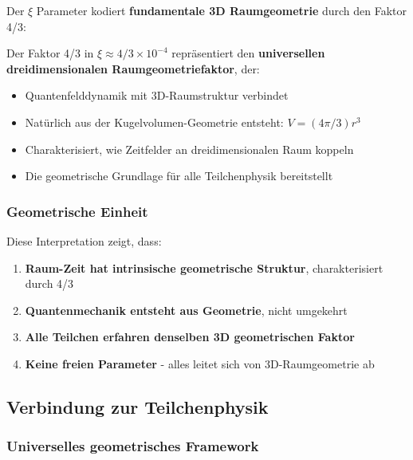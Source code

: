 	Der $\xi$ Parameter kodiert \textbf{fundamentale 3D Raumgeometrie} durch den Faktor 4/3:
	
	\begin{tcolorbox}[colback=yellow!5!white,colframe=orange!75!black,title=Dreidimensionaler Raumgeometriefaktor]
		Der Faktor 4/3 in $\xi \approx 4/3 \times 10^{-4}$ repräsentiert den \textbf{universellen dreidimensionalen Raumgeometriefaktor}, der:
		\begin{itemize}
			\item Quantenfelddynamik mit 3D-Raumstruktur verbindet
			\item Natürlich aus der Kugelvolumen-Geometrie entsteht: $V = (4\pi/3)r^3$
			\item Charakterisiert, wie Zeitfelder an dreidimensionalen Raum koppeln
			\item Die geometrische Grundlage für alle Teilchenphysik bereitstellt
		\end{itemize}
	\end{tcolorbox}
	
	\subsubsection{Geometrische Einheit}
	\label{subsubsec:geometrische_einheit}
	
	Diese Interpretation zeigt, dass:
	\begin{enumerate}
		\item \textbf{Raum-Zeit hat intrinsische geometrische Struktur}, charakterisiert durch 4/3
		\item \textbf{Quantenmechanik entsteht aus Geometrie}, nicht umgekehrt
		\item \textbf{Alle Teilchen erfahren denselben 3D geometrischen Faktor}
		\item \textbf{Keine freien Parameter} - alles leitet sich von 3D-Raumgeometrie ab
	\end{enumerate}
	
	\subsection{Verbindung zur Teilchenphysik}
	\label{subsec:verbindung_teilchenphysik}
	
	\subsubsection{Universelles geometrisches Framework}
	\label{subsubsec:universelles_framework}
	
